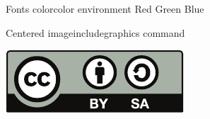 \begin{frame}{Fonts color}{color environment}
    {\color{red} Red}
    {\color{green} Green}
    {\color{blue} Blue}
\end{frame}
\note{
}


\begin{frame}{Centered image}{includegraphics command}
    \begin{center}
        \includegraphics[width=.80\linewidth]{figs/test}
    \end{center}
\end{frame}
\note{
}


